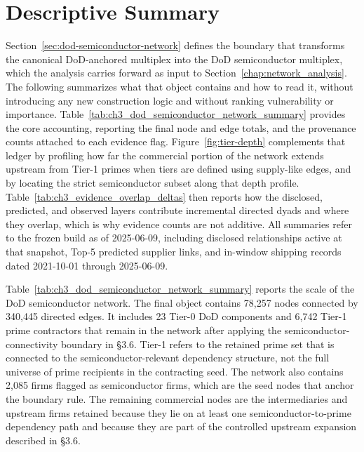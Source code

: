 \section{Descriptive Summary}
\label{sec:descriptive-summary}

Section~\ref{sec:dod-semiconductor-network} defines the boundary that transforms the canonical DoD-anchored multiplex into the DoD semiconductor multiplex, which the analysis carries forward as input to Section~\ref{chap:network_analysis}. The following summarizes what that object contains and how to read it, without introducing any new construction logic and without ranking vulnerability or importance. Table~\ref{tab:ch3_dod_semiconductor_network_summary} provides the core accounting, reporting the final node and edge totals, and the provenance counts attached to each evidence flag. Figure~\ref{fig:tier-depth} complements that ledger by profiling how far the commercial portion of the network extends upstream from Tier-1 primes when tiers are defined using supply-like edges, and by locating the strict semiconductor subset along that depth profile. Table~\ref{tab:ch3_evidence_overlap_deltas} then reports how the disclosed, predicted, and observed layers contribute incremental directed dyads and where they overlap, which is why evidence counts are not additive. All summaries refer to the frozen build as of 2025-06-09, including disclosed relationships active at that snapshot, Top-5 predicted supplier links, and in-window shipping records dated 2021-10-01 through 2025-06-09.

Table~\ref{tab:ch3_dod_semiconductor_network_summary} reports the scale of the DoD semiconductor network. The final object contains 78{,}257 nodes connected by 340{,}445 directed edges. It includes 23 Tier-0 DoD components and 6{,}742 Tier-1 prime contractors that remain in the network after applying the semiconductor-connectivity boundary in \S3.6. Tier-1 refers to the retained prime set that is connected to the semiconductor-relevant dependency structure, not the full universe of prime recipients in the contracting seed. The network also contains 2{,}085 firms flagged as semiconductor firms, which are the seed nodes that anchor the boundary rule. The remaining commercial nodes are the intermediaries and upstream firms retained because they lie on at least one semiconductor-to-prime dependency path and because they are part of the controlled upstream expansion described in \S3.6.

